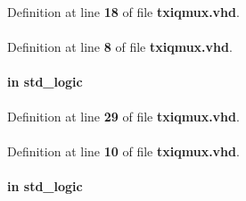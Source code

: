 Definition at line {\bf 18} of file {\bf txiqmux.\+vhd}.

\paragraph[{ieee}]{\hspace{0.3cm}{\ttfamily [Library]}}\label{classtxiqmux_a0a6af6eef40212dbaf130d57ce711256}


Definition at line {\bf 8} of file {\bf txiqmux.\+vhd}.

\paragraph[{mux\+\_\+sel}]{ {\bfseries \textcolor{keywordflow}{in}\textcolor{vhdlchar}{ }} {\bfseries \textcolor{comment}{std\+\_\+logic}\textcolor{vhdlchar}{ }} \hspace{0.3cm}{\ttfamily [Port]}}\label{classtxiqmux_a814c3f03bc84b0d7e34d2db86a250bc0}


Definition at line {\bf 29} of file {\bf txiqmux.\+vhd}.

\paragraph[{numeric\+\_\+std}]{\hspace{0.3cm}{\ttfamily [Package]}}\label{classtxiqmux_a2edc34402b573437d5f25fa90ba4013e}


Definition at line {\bf 10} of file {\bf txiqmux.\+vhd}.

\paragraph[{reset\+\_\+n}]{ {\bfseries \textcolor{keywordflow}{in}\textcolor{vhdlchar}{ }} {\bfseries \textcolor{comment}{std\+\_\+logic}\textcolor{vhdlchar}{ }} \hspace{0.3cm}{\ttfamily [Port]}}\label{classtxiqmux_a446ea52ed8c4a84181a47d9165ce41a5}


